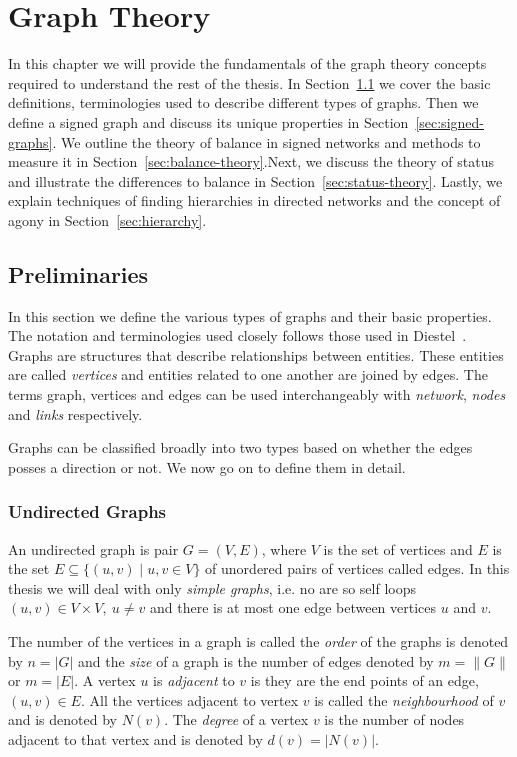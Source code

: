 \chapter{Graph Theory}
\label{chp:graph-theory}
In this chapter we will provide the fundamentals of the graph theory concepts required to understand the rest of the thesis. In Section~\ref{sec:prelim} we cover the basic definitions, terminologies used to describe different types of graphs. Then we define a signed graph and discuss its unique properties in Section~\ref{sec:signed-graphs}. We outline the theory of balance in signed networks and methods to measure it in Section~\ref{sec:balance-theory}.Next, we discuss the theory of status and illustrate the differences to balance in Section~\ref{sec:status-theory}. Lastly, we explain techniques of finding hierarchies in directed networks and the concept of agony in Section~\ref{sec:hierarchy}.

\section{Preliminaries}
\label{sec:prelim}
In this section we define the various types of graphs and their basic properties. The notation and terminologies used closely follows those used in Diestel~\cite{diestel1997graph}. Graphs are structures that describe relationships between entities. These entities are called \textit{vertices} and entities related to one another are joined by edges. The terms graph, vertices and edges can be used interchangeably with \textit{network}, \textit{nodes} and \textit{links} respectively.

Graphs can be classified broadly into two types based on whether the edges posses a direction or not. We now go on to define them in detail.
\subsection{Undirected Graphs}
An undirected graph is pair $G=(V,E)$, where $V$ is the set of vertices and $E$ is the set $E \subseteq \{ (u,v) \mid u,v \in V\}$ of unordered pairs of vertices called edges. In this thesis we will deal with only \textit{simple graphs}, i.e. no are so self loops $(u,v)\in V \times V, ~ u\neq v$ and there is at most one edge between vertices $u$ and $v$. 

The number of the vertices in a graph is called the \textit{order} of the graphs is denoted by $n= |G|$ and the \textit{size} of a graph is the number of edges denoted by $m = \|G\|$ or $m=|E|$. A vertex $u$ is \textit{adjacent} to $v$ is they are the end points of an edge, $(u,v) \in E$. All the vertices adjacent to vertex $v$ is called the \textit{neighbourhood} of $v$ and is denoted by $N(v)$. The \textit{degree} of a vertex $v$ is the number of nodes adjacent to that vertex and is denoted by $d(v) = |N(v)|$. 

